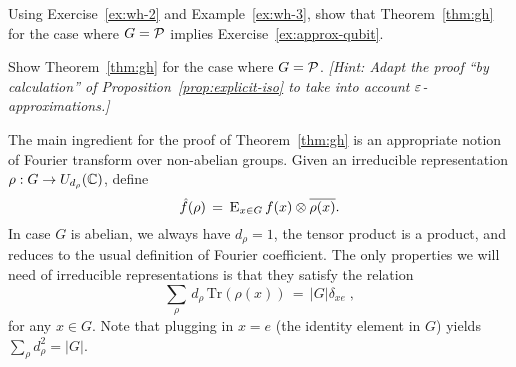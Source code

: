 \begin{exercise}
Using Exercise~\ref{ex:wh-2} and Example~\ref{ex:wh-3}, show that Theorem~\ref{thm:gh} for the case where $G=\mathcal{P}$ implies Exercise~\ref{ex:approx-qubit}. 
\end{exercise}

\begin{exercise}
Show Theorem~\ref{thm:gh} for the case where $G=\mathcal{P}$. \emph{[Hint: Adapt the proof ``by calculation''
of Proposition~\ref{prop:explicit-iso} to take into account $\varepsilon$-approximations.]}
\end{exercise}

The main ingredient for the proof of Theorem~\ref{thm:gh} is an appropriate notion of Fourier transform over non-abelian groups. Given an irreducible representation $\rho: G \to U_{d_\rho}(\mathbb{C})$, define 
\begin{equation}\label{eq:fourier}
 \hat{f}(\rho) \,=\, \textsc{E}_{x\in G} \,f(x) \otimes \overline{\rho(x)}.
\end{equation}
In case $G$ is abelian, we always have $d_\rho=1$, the tensor product is a product, and  reduces to the usual definition of Fourier coefficient. The only properties we will need of irreducible representations is that they satisfy the relation
\begin{equation}
\label{eq:ortho}
\sum_\rho \,d_\rho\,\mathrm{Tr}(\rho(x)) \,=\, |G|\delta_{xe}\;,
\end{equation}
for any $x\in G$. Note that plugging in $x=e$ (the identity element in $G$) yields $\sum_\rho d_\rho^2= |G|$. 

